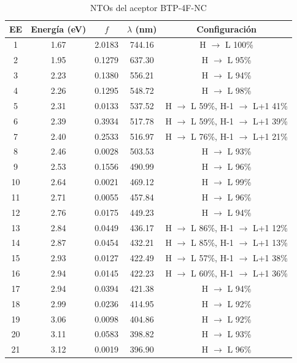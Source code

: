 \begin{table}[H]
\caption{NTOs del aceptor BTP-4F-NC}
\label{table:R25B-9} \vspace{-0.5cm}
{\footnotesize
\begin{center} 
\begin{tabular}{ccccc}
\hline
EE & Energía (eV) & $f$ & $\lambda$ (nm) & Configuración \\ \hline
1 & 1.67 & 2.0183 & 744.16 & H $\rightarrow$ L 100\% \\
2 & 1.95 & 0.1279 & 637.30 & H $\rightarrow$ L 95\% \\
3 & 2.23 & 0.1380 & 556.21 & H $\rightarrow$ L 94\% \\
4 & 2.26 & 0.1295 & 548.72 & H $\rightarrow$ L 98\% \\
5 & 2.31 & 0.0133 & 537.52 & H $\rightarrow$ L 59\%, H-1 $\rightarrow$ L+1 41\% \\
6 & 2.39 & 0.3934 & 517.78 & H $\rightarrow$ L 59\%, H-1 $\rightarrow$ L+1 39\% \\
7 & 2.40 & 0.2533 & 516.97 & H $\rightarrow$ L 76\%, H-1 $\rightarrow$ L+1 21\% \\
8 & 2.46 & 0.0028 & 503.53 & H $\rightarrow$ L 93\% \\
9 & 2.53 & 0.1556 & 490.99 & H $\rightarrow$ L 96\% \\
10 & 2.64 & 0.0021 & 469.12 & H $\rightarrow$ L 99\% \\
11 & 2.71 & 0.0055 & 457.84 & H $\rightarrow$ L 96\% \\
12 & 2.76 & 0.0175 & 449.23 & H $\rightarrow$ L 94\% \\
13 & 2.84 & 0.0449 & 436.17 & H $\rightarrow$ L 86\%, H-1 $\rightarrow$ L+1 12\% \\
14 & 2.87 & 0.0454 & 432.21 & H $\rightarrow$ L 85\%, H-1 $\rightarrow$ L+1 13\% \\
15 & 2.93 & 0.0127 & 422.49 & H $\rightarrow$ L 57\%, H-1 $\rightarrow$ L+1 38\% \\
16 & 2.94 & 0.0145 & 422.23 & H $\rightarrow$ L 60\%, H-1 $\rightarrow$ L+1 36\% \\
17 & 2.94 & 0.0394 & 421.38 & H $\rightarrow$ L 94\% \\
18 & 2.99 & 0.0236 & 414.95 & H $\rightarrow$ L 92\% \\
19 & 3.06 & 0.0098 & 404.86 & H $\rightarrow$ L 92\% \\
20 & 3.11 & 0.0583 & 398.82 & H $\rightarrow$ L 93\% \\
21 & 3.12 & 0.0019 & 396.90 & H $\rightarrow$ L 96\% \\

\end{tabular}
\end{center}}
\end{table}
